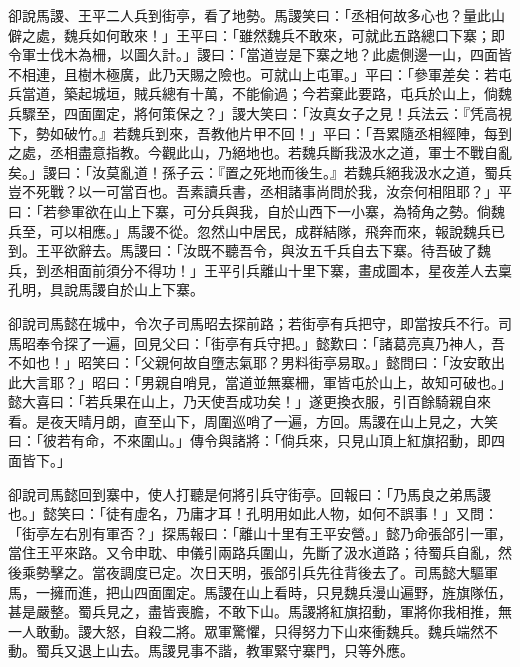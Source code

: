 卻說馬謖、王平二人兵到街亭，看了地勢。馬謖笑曰：「丞相何故多心也？量此山僻之處，魏兵如何敢來！」王平曰：「雖然魏兵不敢來，可就此五路總口下寨；即令軍士伐木為柵，以圖久計。」謖曰：「當道豈是下寨之地？此處側邊一山，四面皆不相連，且樹木極廣，此乃天賜之險也。可就山上屯軍。」平曰：「參軍差矣：若屯兵當道，築起城垣，賊兵總有十萬，不能偷過；今若棄此要路，屯兵於山上，倘魏兵驟至，四面圍定，將何策保之？」謖大笑曰：「汝真女子之見！兵法云：『凭高視下，勢如破竹。』若魏兵到來，吾教他片甲不回！」平曰：「吾累隨丞相經陣，每到之處，丞相盡意指教。今觀此山，乃絕地也。若魏兵斷我汲水之道，軍士不戰自亂矣。」謖曰：「汝莫亂道！孫子云：『置之死地而後生。』若魏兵絕我汲水之道，蜀兵豈不死戰？以一可當百也。吾素讀兵書，丞相諸事尚問於我，汝奈何相阻耶？」平曰：「若參軍欲在山上下寨，可分兵與我，自於山西下一小寨，為犄角之勢。倘魏兵至，可以相應。」馬謖不從。忽然山中居民，成群結隊，飛奔而來，報說魏兵已到。王平欲辭去。馬謖曰：「汝既不聽吾令，與汝五千兵自去下寨。待吾破了魏兵，到丞相面前須分不得功！」王平引兵離山十里下寨，畫成圖本，星夜差人去稟孔明，具說馬謖自於山上下寨。

卻說司馬懿在城中，令次子司馬昭去探前路；若街亭有兵把守，即當按兵不行。司馬昭奉令探了一遍，回見父曰：「街亭有兵守把。」懿歎曰：「諸葛亮真乃神人，吾不如也！」昭笑曰：「父親何故自墮志氣耶？男料街亭易取。」懿問曰：「汝安敢出此大言耶？」昭曰：「男親自哨見，當道並無寨柵，軍皆屯於山上，故知可破也。」懿大喜曰：「若兵果在山上，乃天使吾成功矣！」遂更換衣服，引百餘騎親自來看。是夜天晴月朗，直至山下，周圍巡哨了一遍，方回。馬謖在山上見之，大笑曰：「彼若有命，不來圍山。」傳令與諸將：「倘兵來，只見山頂上紅旗招動，即四面皆下。」

卻說司馬懿回到寨中，使人打聽是何將引兵守街亭。回報曰：「乃馬良之弟馬謖也。」懿笑曰：「徒有虛名，乃庸才耳！孔明用如此人物，如何不誤事！」又問：「街亭左右別有軍否？」探馬報曰：「離山十里有王平安營。」懿乃命張郃引一軍，當住王平來路。又令申耽、申儀引兩路兵圍山，先斷了汲水道路；待蜀兵自亂，然後乘勢擊之。當夜調度已定。次日天明，張郃引兵先往背後去了。司馬懿大驅軍馬，一擁而進，把山四面圍定。馬謖在山上看時，只見魏兵漫山遍野，旌旗隊伍，甚是嚴整。蜀兵見之，盡皆喪膽，不敢下山。馬謖將紅旗招動，軍將你我相推，無一人敢動。謖大怒，自殺二將。眾軍驚懼，只得努力下山來衝魏兵。魏兵端然不動。蜀兵又退上山去。馬謖見事不諧，教軍緊守寨門，只等外應。

